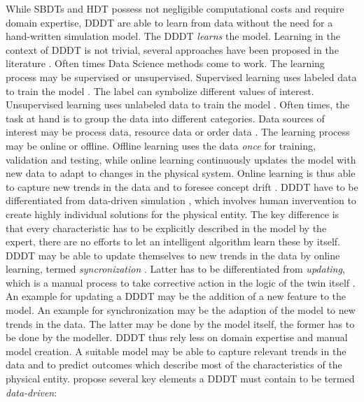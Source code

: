 While SBDTs and HDT possess not negligible computational costs and require domain expertise, DDDT are able to learn from data without the need for a hand-written simulation model. The DDDT \textit{learns} the model. Learning in the context of DDDT is not trivial, several approaches have been proposed in the literature \autocite{he2019data,Friederich2022,francis2021towards}. Often times Data Science methods come to work. The learning process may be supervised or unsupervised. Supervised learning uses labeled data to train the model \autocite{cunningham2008supervised}. The label can symbolize different values of interest. Unsupervised learning uses unlabeled data to train the model \autocite{barlow1989unsupervised}. Often times, the task at hand is to group the data into different categories. Data sources of interest may be process data, resource data or order data \autocite{Biesinger2019}.
The learning process may be online or offline. Offline learning uses the data \textit{once} for training, validation and testing, while online learning continuously updates the model with new data to adapt to changes in the physical system. Online learning is thus able to capture new trends in the data and to foresee concept drift \autocite{tsymbal2004problem}. DDDT have to be differentiated from data-driven simulation \autocite{Charpentier2014}, which involves human invervention to create highly individual solutions for the physical entity. The key difference is that every characteristic has to be explicitly described in the model by the expert, there are no efforts to let an intelligent algorithm learn these by itself. DDDT may be able to update themselves to new trends in the data by online learning, termed \textit{syncronization} \autocite{reinhardt2019survey}. Latter has to be differentiated from \textit{updating}, which is a manual process to take corrective action in the logic of the twin itself \autocite{schwede2024learning}. An example for updating a DDDT may be the addition of a new feature to the model. An example for synchronization may be the adaption of the model to new trends in the data. The latter may be done by the model itself, the former has to be done by the modeller.
DDDT thus rely less on domain expertise and manual model creation. A suitable model may be able to capture relevant trends in the data and to predict outcomes which describe most of the characteristics of the physical entity. \autocite{francis2021towards} propose several key elements a DDDT must contain to be termed \textit{data-driven}:

